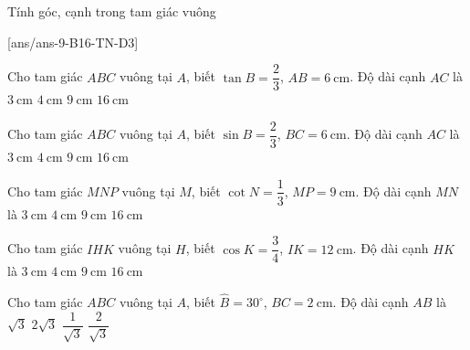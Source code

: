 \begin{dang}{Tính góc, cạnh trong tam giác vuông}
\end{dang}
[ans/ans-9-B16-TN-D3]
\begin{ex}%
	Cho tam giác $ABC$ vuông tại $A$, biết $\tan B=\dfrac{2}{3}$, $AB=6\mathrm{~cm}$. Độ dài cạnh $AC$ là
	\choice
	{$3\mathrm{~cm}$}
	{\True $4\mathrm{~cm}$}
	{$9\mathrm{~cm}$}
	{$16\mathrm{~cm}$}
\end{ex}
\begin{ex}%
	Cho tam giác $ABC$ vuông tại $A$, biết $\sin B=\dfrac{2}{3}$, $BC=6\mathrm{~cm}$. Độ dài cạnh $AC$ là
	\choice
	{$3\mathrm{~cm}$}
	{\True $4\mathrm{~cm}$}
	{$9\mathrm{~cm}$}
	{$16\mathrm{~cm}$}
\end{ex}
\begin{ex}%
	Cho tam giác $MNP$ vuông tại $M$, biết $\cot N=\dfrac{1}{3}$, $MP=9\mathrm{~cm}$. Độ dài cạnh $MN$ là
	\choice
	{\True $3\mathrm{~cm}$}
	{$4\mathrm{~cm}$}
	{$9\mathrm{~cm}$}
	{$16\mathrm{~cm}$}
\end{ex}
\begin{ex}%
	Cho tam giác $IHK$ vuông tại $H$, biết $\cos K=\dfrac{3}{4}$, $IK=12\mathrm{~cm}$. Độ dài cạnh $HK$ là
	\choice
	{$3\mathrm{~cm}$}
	{$4\mathrm{~cm}$}
	{\True $9\mathrm{~cm}$}
	{$16\mathrm{~cm}$}
\end{ex}
\begin{ex}%
	Cho tam giác $ABC$ vuông tại $A$, biết $\widehat{B}=30^\circ$, $BC=2\mathrm{~cm}$. Độ dài cạnh $AB$ là
	\choice
	{\True $\sqrt{3}$}
	{$2\sqrt{3}$}
	{$\dfrac{1}{\sqrt{3}}$}
	{$\dfrac{2}{\sqrt{3}}$}
\end{ex}
